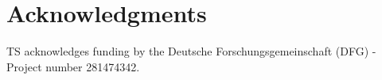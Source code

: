 \section{Acknowledgments}\label{ch:acknowledgments}
TS acknowledges funding by the Deutsche Forschungsgemeinschaft (DFG) - Project number 281474342.
